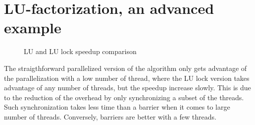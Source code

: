 \chapter{LU-factorization, an advanced example}

\begin{figure}[!h]
  \begin{center}
  \end{center}
  \caption{LU and LU lock speedup comparison}
  \label{fig:lu}
\end{figure}

The straigthforward parallelized version of the algorithm only gets advantage of the parallelization with a low number of thread, where the LU lock version takes advantage of any number of threads, but the speedup increase slowly. This is due to the reduction of the overhead by only synchronizing a subset of the threads. Such synchronization takes less time than a barrier when it comes to large number of threads. Conversely, barriers are better with a few threads.

